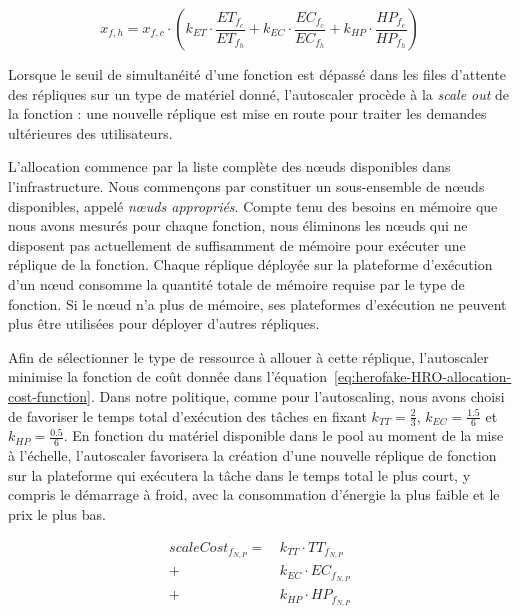 \begin{equation}
    x_{f, h} = x_{f, c} \cdot (k_{ET} \cdot \frac{ET_{{f}_{c}}}{ET_{{f}_{h}}} + k_{EC} \cdot \frac{EC_{{f}_{c}}}{EC_{{f}_{h}}} + k_{HP} \cdot \frac{HP_{{f}_{c}}}{HP_{{f}_{h}}})
\label{eq:herofake-HRO-concurrency-target}
\end{equation}

Lorsque le seuil de simultanéité d'une fonction est dépassé dans les files d'attente des répliques sur un type de matériel donné, l'autoscaler procède à la \textit{scale out} de la fonction : une nouvelle réplique est mise en route pour traiter les demandes ultérieures des utilisateurs.

L'allocation commence par la liste complète des nœuds disponibles dans l'infrastructure. Nous commençons par constituer un sous-ensemble de nœuds disponibles, appelé \textit{nœuds appropriés}. Compte tenu des besoins en mémoire que nous avons mesurés pour chaque fonction, nous éliminons les nœuds qui ne disposent pas actuellement de suffisamment de mémoire pour exécuter une réplique de la fonction. Chaque réplique déployée sur la plateforme d'exécution d'un nœud consomme la quantité totale de mémoire requise par le type de fonction. Si le nœud n'a plus de mémoire, ses plateformes d'exécution ne peuvent plus être utilisées pour déployer d'autres répliques.

Afin de sélectionner le type de ressource à allouer à cette réplique, l'autoscaler minimise la fonction de coût donnée dans l'équation~\ref{eq:herofake-HRO-allocation-cost-function}. 
Dans notre politique, comme pour l'autoscaling, nous avons choisi de favoriser le temps total d'exécution des tâches en fixant $k_{TT} = \frac{2}{3}$, $k_{EC} = \frac{1.5}{6}$ et $k_{HP} = \frac{0.5}{6}$. 
En fonction du matériel disponible dans le pool au moment de la mise à l'échelle, l'autoscaler favorisera la création d'une nouvelle réplique de fonction sur la plateforme qui exécutera la tâche dans le temps total le plus court, y compris le démarrage à froid, avec la consommation d'énergie la plus faible et le prix le plus bas.

\begin{equation}
\begin{split}
    scaleCost_{{f}_{N, P}} = \, &k_{TT} \cdot {TT}_{{f}_{N, P}} \\
    + &k_{EC} \cdot {EC}_{{f}_{N, P}} \\
    + &k_{HP} \cdot {HP}_{{f}_{N, P}}
\end{split}
\label{eq:herofake-HRO-allocation-cost-function}
\end{equation}


